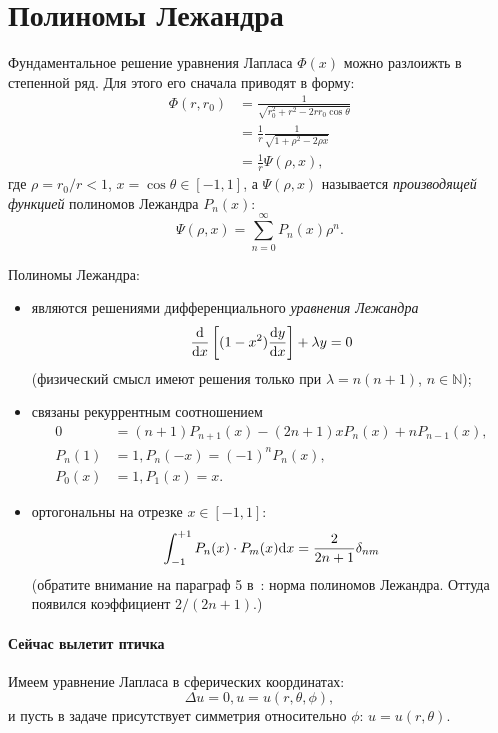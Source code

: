 \documentclass[12pt]{report}
\begin{document}
\section{Полиномы Лежандра}
Фундаментальное решение уравнения Лапласа $\Phi(x)$ можно разлоижть в степенной ряд. Для этого его сначала приводят в форму:~\cite[стр.~672]{Tikhonov}
\begin{align*}
\Phi(r,r_0) &=  \frac{1}{\sqrt{r_0^2 + r^2 -2rr_0\cos\theta}} \tag{теорема косинусов}\\
&= \frac1r\frac{1}{\sqrt{1 + \rho^2 -2\rho x}} \\
&= \frac1r\Psi(\rho, x),
\end{align*}
где $\rho = r_0/r < 1$, $x = \cos\theta\in [-1, 1]$, а $\Psi(\rho, x)$ называется \emph{производящей функцией} полиномов Лежандра $P_n(x)$:
\[
\Psi(\rho, x) = \sum_{n=0}^\infty P_n(x)\rho^n.
\]

Полиномы Лежандра:
\begin{itemize}
	\item являются решениями дифференциального \emph{уравнения Лежандра}
	\[
	\frac{\mathrm d}{\mathrm d x}\left[(1-x^2)\frac{\mathrm d y}{\mathrm d x}\right] + \lambda y = 0
	\]
	(физический смысл имеют решения только при $\lambda=n(n+1)$, $n\in\mathbb{N}$);
	\item связаны рекуррентным соотношением
	\begin{align*}
	0 &= (n+1)P_{n+1}(x) - (2n+1)xP_n(x) + nP_{n-1}(x), \\
	P_n(1) &= 1, P_n(-x) = (-1)^nP_n(x), \\
	P_0(x) &= 1, P_1(x) = x.
	\end{align*}
	\item ортогональны на отрезке $x \in [-1, 1]$:
	\[
	\int_{-1}^{+1} P_n(x)\cdot P_m(x)\mathrm d x = \frac{2}{2n+1}\delta_{nm}
	\]
	(обратите внимание на параграф 5 в~\cite{Tikhonov:Legandre}: норма полиномов Лежандра. Оттуда появился коэффициент $2/(2n+1)$.)
\end{itemize}
\paragraph{Сейчас вылетит птичка}
Имеем уравнение Лапласа в сферических координатах:
\[
\Delta u = 0, u = u(r,\theta,\phi),
\]
и пусть в задаче присутствует симметрия относительно $\phi$: $u = u(r,\theta)$.
\end{document}
